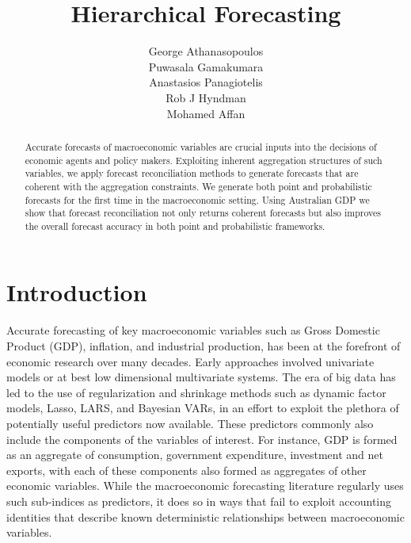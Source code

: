 \documentclass[a4paper, 11pt]{article}
\title{Hierarchical Forecasting}
\author{George Athanasopoulos\\ Puwasala Gamakumara\\ Anastasios Panagiotelis\\ Rob J Hyndman\\ Mohamed Affan}
\begin{document}
\maketitle

\begin{abstract}
  Accurate forecasts of macroeconomic variables are crucial inputs into the decisions of economic agents and policy makers. Exploiting inherent aggregation structures of such variables, we apply forecast reconciliation methods to generate forecasts that are coherent with the aggregation constraints. We generate both point and probabilistic forecasts for the first time in the macroeconomic setting. Using Australian  GDP we show that forecast reconciliation not only returns coherent forecasts but also improves the overall forecast accuracy in both point and probabilistic frameworks.
\end{abstract}

\section{Introduction}\label{sec:intro}

Accurate forecasting of key macroeconomic variables such as Gross Domestic Product (GDP), inflation, and industrial production, has been at the forefront of economic research over many decades. Early approaches involved univariate models or at best low dimensional multivariate systems. The era of big data has led to the use of regularization and shrinkage methods such as dynamic factor models, Lasso, LARS, and Bayesian VARs, in an effort to exploit the plethora of potentially useful predictors now available. These predictors commonly also include the components of the variables of interest. For instance, GDP is formed as an aggregate of consumption, government expenditure, investment and net exports, with each of these components also formed as aggregates of other economic variables. While the macroeconomic forecasting literature regularly uses such sub-indices as predictors, it does so in ways that fail to exploit accounting identities that describe known deterministic relationships between macroeconomic variables.
\end{document}
